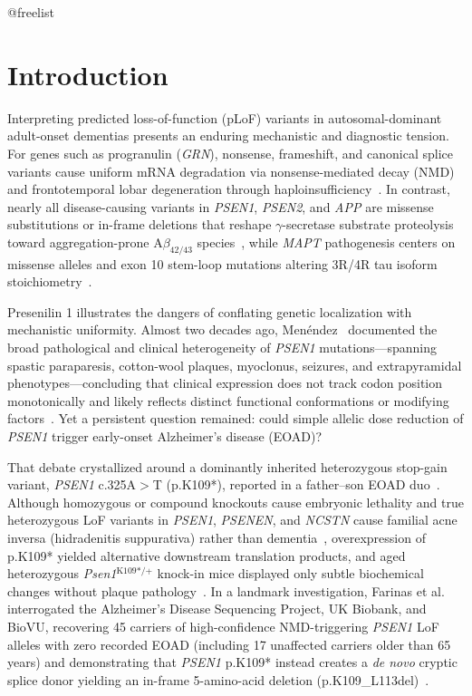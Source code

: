 \documentclass[11pt,a4paper]{article}
\makeatletter
\newcommand{\FloatBarrier}{%
  \par
  \expandafter\ifx\csname @freelist\endcsname\relax\else
    \ifx\@deferlist\@empty\else
      \clearpage
    \fi
  \fi
}
\let\orig@section\section
\renewcommand{\section}{\FloatBarrier\orig@section}
\makeatother
\begin{document}
\section{Introduction}

Interpreting predicted loss-of-function (pLoF) variants in autosomal-dominant adult-onset dementias presents an enduring mechanistic and diagnostic tension. For genes such as progranulin (\textit{GRN}), nonsense, frameshift, and canonical splice variants cause uniform mRNA degradation via nonsense-mediated decay (NMD) and frontotemporal lobar degeneration through haploinsufficiency~\cite{baker2006}. In contrast, nearly all disease-causing variants in \textit{PSEN1}, \textit{PSEN2}, and \textit{APP} are missense substitutions or in-frame deletions that reshape $\gamma$-secretase substrate proteolysis toward aggregation-prone A$\beta_{42/43}$ species~\cite{zhou2019,arber2019}, while \textit{MAPT} pathogenesis centers on missense alleles and exon 10 stem-loop mutations altering 3R/4R tau isoform stoichiometry~\cite{hutton1998,grover1999}.

Presenilin 1 illustrates the dangers of conflating genetic localization with mechanistic uniformity. Almost two decades ago, Men{\'e}ndez~\cite{menendez2004} documented the broad pathological and clinical heterogeneity of \textit{PSEN1} mutations—spanning spastic paraparesis, cotton-wool plaques, myoclonus, seizures, and extrapyramidal phenotypes—concluding that clinical expression does not track codon position monotonically and likely reflects distinct functional conformations or modifying factors~\cite{menendez2004}. Yet a persistent question remained: could simple allelic dose reduction of \textit{PSEN1} trigger early-onset Alzheimer's disease (EOAD)?

That debate crystallized around a dominantly inherited heterozygous stop-gain variant, \textit{PSEN1} c.325A$>$T (p.K109*), reported in a father--son EOAD duo~\cite{sanjuanruiz2025}. Although homozygous or compound knockouts cause embryonic lethality and true heterozygous LoF variants in \textit{PSEN1}, \textit{PSENEN}, and \textit{NCSTN} cause familial acne inversa (hidradenitis suppurativa) rather than dementia~\cite{wang2010}, overexpression of p.K109* yielded alternative downstream translation products, and aged heterozygous \textit{Psen1}$^{\text{K109*/+}}$ knock-in mice displayed only subtle biochemical changes without plaque pathology~\cite{sanjuanruiz2025}. In a landmark investigation, Farinas et al.~\cite{farinas2026} interrogated the Alzheimer's Disease Sequencing Project, UK Biobank, and BioVU, recovering 45 carriers of high-confidence NMD-triggering \textit{PSEN1} LoF alleles with zero recorded EOAD (including 17 unaffected carriers older than 65 years) and demonstrating that \textit{PSEN1} p.K109* instead creates a \textit{de novo} cryptic splice donor yielding an in-frame 5-amino-acid deletion (p.K109\_L113del)~\cite{farinas2026}.
\end{document}
